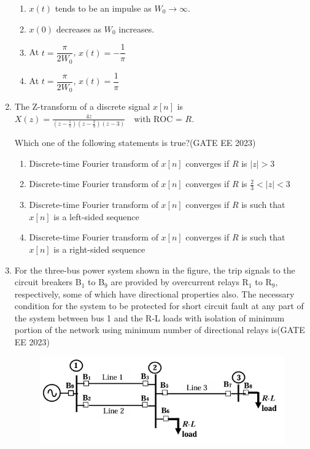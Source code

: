 \documentclass[a4paper,12pt]{exam}
\theoremstyle{remark}
\begin{document}
\begin{enumerate}
\begin{multicols}{2}
\begin{enumerate}
    \item $x(t)$ tends to be an impulse as $W_0 \to \infty$.
    \item $x(0)$ decreases as $W_0$ increases.
    \item At $t = \dfrac{\pi}{2 W_0}$, $x(t) = -\dfrac{1}{\pi}$
    \item At $t = \dfrac{\pi}{2 W_0}$, $x(t) = \dfrac{1}{\pi}$
\end{enumerate}
\end{multicols}
\newpage
\item The Z-transform of a discrete signal $x[n]$ is
$
X(z) = \frac{4z}{\left(z - \frac{1}{5}\right)\left(z - \frac{2}{3}\right)\left(z - 3\right)} \quad \text{with ROC = } R.
$

Which one of the following statements is true?\hfill{(GATE EE 2023)}


\begin{enumerate}
    \item Discrete-time Fourier transform of $x[n]$ converges if $R$ is $|z| > 3$
    \item Discrete-time Fourier transform of $x[n]$ converges if $R$ is $\frac{2}{3} < |z| < 3$
    \item Discrete-time Fourier transform of $x[n]$ converges if $R$ is such that $x[n]$ is a left-sided sequence
    \item Discrete-time Fourier transform of $x[n]$ converges if $R$ is such that $x[n]$ is a right-sided sequence
\end{enumerate}

\item For the three-bus power system shown in the figure, the trip signals to the circuit breakers B$_1$ to B$_9$ are provided by overcurrent relays R$_1$ to R$_9$, respectively, some of which have directional properties also. The necessary condition for the system to be protected for short circuit fault at any part of the system between bus 1 and the R-L loads with isolation of minimum portion of the network using minimum number of directional relays is\hfill{(GATE EE 2023)}
\begin{figure}[H]
    \centering
    \includegraphics[width=0.5\columnwidth]{figs/Screenshot_17-8-2025_205732_.jpeg}
    \caption{}
    \label{fig:placeholder}
\end{figure}


\end{enumerate}
\end{document}

